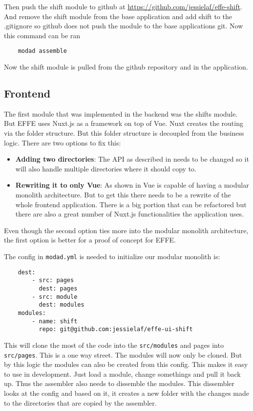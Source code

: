 Then push the shift module to github at \url{https://github.com/jessielaf/effe-shift}. And remove the shift module from the base application and add shift to the .gitignore so github does not push the module to the base applications git. Now this command can be ran
\begin{verbatim}
    modad assemble
\end{verbatim}

Now the shift module is pulled from the github repository and in the application.

\subsection{Frontend}

The first module that was implemented in the backend was the shifts module. But EFFE uses Nuxt.js as a framework on top of Vue. Nuxt creates the routing via the folder structure. But this folder structure is decoupled from the business logic. There are two options to fix this:

\begin{itemize}
    \item \textbf{Adding two directories}: The API as described in  needs to be changed so it will also handle multiple directories where it should copy to.
    \item \textbf{Rewriting it to only Vue}: As shown in  Vue is capable of having a modular monolith architecture. But to get this there needs to be a rewrite of the whole frontend application. There is a big portion that can be refactored but there are also a great number of Nuxt.js functionalities the application uses.
\end{itemize}

Even though the second option ties more into the modular monolith architecture, the first option is better for a proof of concept for EFFE.

The config in \texttt{modad.yml} is needed to initialize our modular monolith is:
\begin{verbatim}
    dest:
        - src: pages
          dest: pages
        - src: module
          dest: modules
    modules:
        - name: shift
          repo: git@github.com:jessielaf/effe-ui-shift
\end{verbatim}

This will clone the most of the code into the \texttt{src/modules} and pages into \texttt{src/pages}. This is a one way street. The modules will now only be cloned. But by this logic the modules can also be created from this config. This makes it easy to use in development. Just load a module, change somethings and pull it back up. Thus the assembler also needs to dissemble the modules. This dissembler looks at the config and based on it, it creates a new folder with the changes made to the directories that are copied by the assembler.

